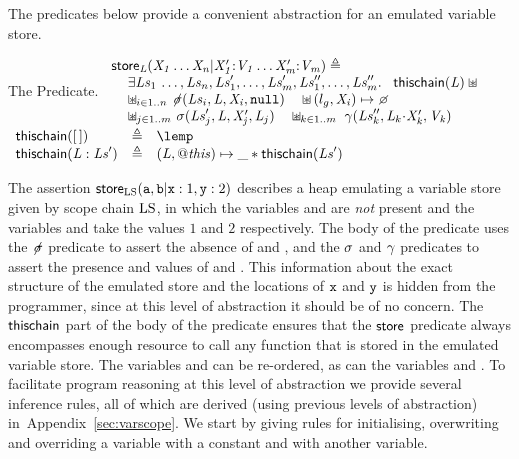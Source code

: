 \documentclass{article}
\newcommand{\iflong}[1]{#1}
\newcommand{\ifshort}[1]{}
\begin{document}
The predicates below provide a convenient abstraction for an emulated variable store.
\begin{display}{The \store Predicate.}
$\begin{array}{l}
\store_{\E{L}}(\E{X_1}\dots \E{X_n} | \E{X_1'}\cons\E{V_1} \dots \E{X_m'}\cons\E{V_m}) \triangleq \\
~~\begin{array}{l}
        \exists \Lista\,\dots,\List_n,\Lista',\dots,\List_m',\Lista'',\dots,\List_m''  \st~~
        \thischain(\E{L}) \sepish{}\\
        \sepish_{i\in 1..n}~\notscope(\List_i,\E{L},\E{X_i},\nil) \quad\sepish (\lgo,\E{X_i})\pointsto\none \\
        \sepish_{j\in 1..m}~\scope(\List_j',\E{L},\E{X_j'},\E{L}_j)\quad
        \sepish_{k\in 1..m}~\getValue(\List_k'',\E{L}_k\sv\E{X_k'},\E{V_k}) \\        
\end{array}
\end{array}$
\\[\gap]
$\begin{array}{lll}
        \thischain({\emptylist}) & \triangleq & \lemp \\
        \thischain(\E{L}:\E{Ls}') & \triangleq & (\E{L},\thisp)\pointsto\_ \sep {}
                        \thischain(\E{Ls}')
\end{array}$
\end{display}

The assertion $\mathsf{store}_{{\mathrm{LS}}}(\mbox{\texttt{{\upshape a}}},\mbox{\texttt{{\upshape b}}}|\mbox{\texttt{{\upshape x}}}:1,\mbox{\texttt{{\upshape y}}}:2)$
describes a heap emulating a variable store given by scope chain ${\mathrm{LS}}$,  in which the variables
 and  are \emph{not} present and  the
variables  and  take the values $1$ and $2$ respectively.
The body of the predicate uses the ${\not\!\sigma}$ predicate to assert the
absence of  and , and the $\sigma$ and $\gamma$
predicates to assert the presence and values of  and .
This information about the exact structure of the emulated store and
the locations of $\mbox{\texttt{{\upshape x}}}$ and $\mbox{\texttt{{\upshape y}}}$ is hidden from the programmer,
since at this level of abstraction it should be of no concern. The
$\mathsf{thischain}$ part of the body of the predicate ensures that the
$\mathsf{store}$ predicate always encompasses enough resource to call any
function that is stored in the emulated variable store.
 The variables  and 
 can be re-ordered, as can the variables  and . To
facilitate program reasoning at this level of abstraction we provide several inference rules,
all of which are derived  (using previous levels of abstraction) in~\ifshort{\cite{proofs}}\iflong{Appendix~\ref{sec:varscope}}.
We start by giving rules for  initialising, overwriting and
overriding a variable with a constant and with another variable.
\end{document}

